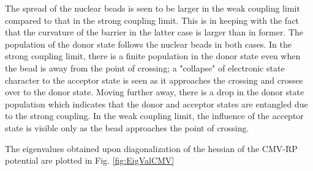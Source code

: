 \documentclass[%
 aip,
 jmp,%
 amsmath,amssymb,
reprint,%
]{revtex4-1}
\begin{document}
The spread of the nuclear beads is seen to be larger in the weak coupling limit compared to that in the strong coupling limit. This is in keeping with the fact that the curvature of the barrier in the latter case is larger than in former. The population of the donor state follows the nuclear beads in both cases. In the strong coupling limit, there is a finite population in the donor state even when the bead is away from the point of crossing; a "collapse" of electronic state character to the acceptor state is seen as it approaches the crossing and crosses over to the donor state. Moving further away, there is a drop in the donor state population which indicates that the donor and acceptor states are entangled due to the strong coupling. In the weak coupling limit, the influence of the acceptor state is visible only as the bead approaches the point of crossing. 
\par The eigenvalues obtained upon diagonalization of the hessian of the CMV-RP potential are plotted in Fig. \ref{fig:EigValCMV}
\end{document}
